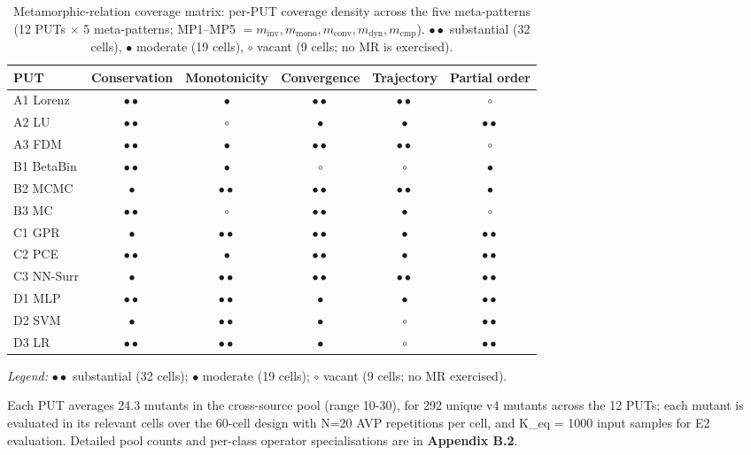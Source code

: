\documentclass[manuscript,screen,review]{acmart}
\begin{document}
{%
\small
\begin{longtable}[]{@{}lccccc@{}}
\caption{Metamorphic-relation coverage matrix: per-PUT coverage density across the five meta-patterns (12 PUTs $\times$ 5 meta-patterns; MP1--MP5 $= m_{\mathrm{inv}}, m_{\mathrm{mono}}, m_{\mathrm{conv}}, m_{\mathrm{dyn}}, m_{\mathrm{cmp}}$). $\bullet\bullet$ substantial (32 cells), $\bullet$ moderate (19 cells), $\circ$ vacant (9 cells; no MR is exercised).}\label{tab:p2-cells}\\
\toprule\noalign{}
PUT & Conservation & Monotonicity & Convergence & Trajectory & Partial order \\
\midrule\noalign{}
\endfirsthead
\endhead
\bottomrule\noalign{}
\endlastfoot
A1 Lorenz  & $\bullet\bullet$ & $\bullet$ & $\bullet\bullet$ & $\bullet\bullet$ & $\circ$ \\
A2 LU      & $\bullet\bullet$ & $\circ$ & $\bullet$ & $\bullet$ & $\bullet\bullet$ \\
A3 FDM     & $\bullet\bullet$ & $\bullet$ & $\bullet\bullet$ & $\bullet\bullet$ & $\circ$ \\
B1 BetaBin & $\bullet\bullet$ & $\bullet$ & $\circ$ & $\circ$ & $\bullet$ \\
B2 MCMC    & $\bullet$ & $\bullet\bullet$ & $\bullet\bullet$ & $\bullet\bullet$ & $\bullet$ \\
B3 MC      & $\bullet\bullet$ & $\circ$ & $\bullet\bullet$ & $\bullet$ & $\circ$ \\
C1 GPR     & $\bullet$ & $\bullet\bullet$ & $\bullet\bullet$ & $\bullet$ & $\bullet\bullet$ \\
C2 PCE     & $\bullet\bullet$ & $\bullet$ & $\bullet\bullet$ & $\bullet$ & $\bullet\bullet$ \\
C3 NN-Surr & $\bullet$ & $\bullet\bullet$ & $\bullet\bullet$ & $\bullet\bullet$ & $\bullet\bullet$ \\
D1 MLP     & $\bullet\bullet$ & $\bullet\bullet$ & $\bullet$ & $\bullet$ & $\bullet\bullet$ \\
D2 SVM     & $\bullet$ & $\bullet\bullet$ & $\bullet$ & $\circ$ & $\bullet\bullet$ \\
D3 LR      & $\bullet\bullet$ & $\bullet\bullet$ & $\bullet$ & $\circ$ & $\bullet\bullet$ \\
\end{longtable}
}

\noindent\emph{Legend:} $\bullet\bullet$ substantial (32 cells); $\bullet$ moderate (19 cells); $\circ$ vacant (9 cells; no MR exercised).

Each PUT averages 24.3 mutants in the cross-source pool (range
10-30), for 292 unique v4 mutants across the 12 PUTs; each mutant is
evaluated in its relevant cells over the 60-cell design with N=20 AVP
repetitions per cell, and K\_eq = 1000 input samples for E2 evaluation. Detailed
pool counts and per-class operator specialisations are in
\textbf{Appendix B.2}.
\end{document}
